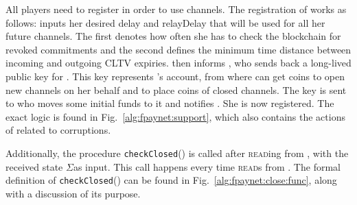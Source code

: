   All players need to register in order to use channels. The registration of
  \alice{} works as follows: \alice{} inputs her desired delay and relayDelay
  that will be used for all her future channels. The first denotes how often she
  has to check the blockchain for revoked commitments and the second defines the
  minimum time distance between incoming and outgoing CLTV expiries. \fpaynet{}
  then informs \simulator{}, who sends back a long-lived public key for \alice.
  This key represents \alice's account, from where \fpaynet{} can get coins to
  open new channels on her behalf and to place coins of closed channels. The key
  is sent to \alice{} who moves some initial funds to it and notifies
  \fpaynet{}. She is now registered. The exact logic is found in
  Fig.~\ref{alg:fpaynet:support}, which also contains the actions of \fpaynet{}
  related to corruptions.

  Additionally, the procedure \texttt{checkClosed}() is called after
  \textsc{read}ing from \ledger, with the received state $\Sigma$as input. This
  call happens every time \fpaynet{} \textsc{read}s from \ledger. The formal
  definition of \texttt{checkClosed}() can be found in
  Fig.~\ref{alg:fpaynet:close:func}, along with a discussion of its purpose.

